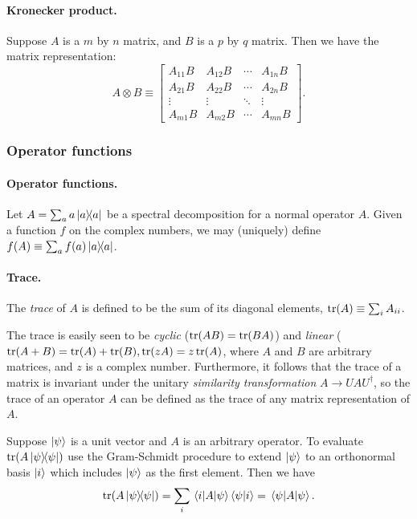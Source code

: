 \documentclass{article}
\numberwithin{theorem}{section}
\numberwithin{corollary}{section}
\numberwithin{postulate}{section}
\begin{document}
\paragraph{Kronecker product.} Suppose $A$ is a $m$ by $n$ matrix, and $B$ is a
$p$ by $q$ matrix. Then we have the matrix representation: \[
  A \otimes B \equiv
  \begin{bmatrix}
    A_{11}B & A_{12}B & \cdots & A_{1n}B \\
    A_{21}B & A_{22}B & \cdots & A_{2n}B \\
    \vdots & \vdots & \ddots & \vdots \\
    A_{m1}B & A_{m2}B & \cdots & A_{mn}B
  \end{bmatrix}.
\]

\subsubsection{Operator functions}

\paragraph{Operator functions.} Let $A = \sum_a a\op{a}{a}$ be a spectral
decomposition for a normal operator $A$. Given a function $f$ on the complex
numbers, we may (uniquely) define $f(A) \equiv \sum_a f(a)\op{a}{a}$.

\paragraph{Trace.} The \emph{trace} of $A$ is defined to be the sum of its
diagonal elements, $\tr(A) \equiv \sum_i A_{ii}$.

The trace is easily seen to be \emph{cyclic} ($\tr(AB) = \tr(BA)$) and
\emph{linear} ($\tr(A + B) = \tr(A) + \tr(B), \tr(zA) = z\tr(A)$, where $A$ and
$B$ are arbitrary matrices, and $z$ is a complex number. Furthermore, it
follows that the trace of a matrix is invariant under the unitary
\emph{similarity transformation} $A \to UAU^{\dagger}$, so the trace of an
operator $A$ can be defined as the trace of any matrix representation of $A$.

Suppose $\ket{\psi}$ is a unit vector and $A$ is an arbitrary operator. To
evaluate $\tr(A\op{\psi}{\psi})$ use the Gram-Schmidt procedure to extend
$\ket{\psi}$ to an orthonormal basis $\ket{i}$ which includes $\ket{\psi}$ as
the first element. Then we have \[
  \tr(A\op{\psi}{\psi}) = \sum_i \mel{i}{A}{\psi}\ip{\psi}{i} =
  \mel{\psi}{A}{\psi}.
\]
\end{document}
